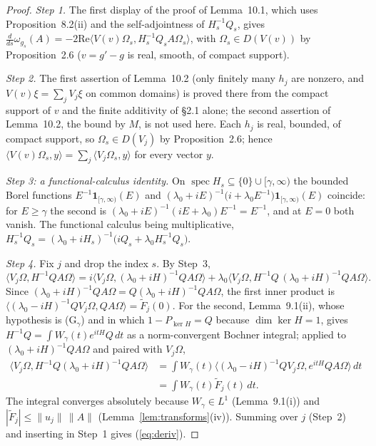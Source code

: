 \documentclass[11pt,a4paper]{article}
\newcommand{\Om}{\Omega}
\newcommand{\ip}[2]{\langle #1,#2\rangle}
\DeclareMathOperator{\spec}{spec}
\newcommand{\Ft}{\widetilde F}
\theoremstyle{plain}
\theoremstyle{definition}
\begin{document}
\begin{proof}
\emph{Step 1.}  The first display of the proof of Lemma~10.1, which uses Proposition~8.2(ii)
and the self-adjointness of $H_s^{-1}Q_s$, gives
$\frac d{ds}\omega_{g_s}(A)=-2\mathrm{Re}\ip{V(v)\Om_s}{H_s^{-1}Q_sA\Om_s}$, with
$\Om_s\in D(V(v))$ by Proposition~2.6 ($v=g'-g$ is real, smooth, of compact support).

\emph{Step 2.}  The first assertion of Lemma~10.2 (only finitely many $h_j$ are nonzero, and
$V(v)\xi=\sum_jV_j\xi$ on common domains) is proved there from the compact support of $v$ and
the finite additivity of \S2.1 alone; the second assertion of Lemma~10.2, the bound by $M$, is
not used here.  Each $h_j$ is real, bounded, of compact support, so $\Om_s\in D(V_j)$ by
Proposition~2.6; hence $\ip{V(v)\Om_s}{y}=\sum_j\ip{V_j\Om_s}{y}$ for every vector $y$.

\emph{Step 3: a functional-calculus identity.}  On $\spec H_s\subseteq\{0\}\cup[\gamma,\infty)$
the bounded Borel functions $E^{-1}\mathbf 1_{[\gamma,\infty)}(E)$ and
$(\lambda_0+iE)^{-1}\bigl(i+\lambda_0E^{-1}\bigr)\mathbf 1_{[\gamma,\infty)}(E)$ coincide: for
$E\ge\gamma$ the second is $(\lambda_0+iE)^{-1}(iE+\lambda_0)E^{-1}=E^{-1}$, and at $E=0$ both
vanish.  The functional calculus being multiplicative,
$H_s^{-1}Q_s=(\lambda_0+iH_s)^{-1}\bigl(iQ_s+\lambda_0H_s^{-1}Q_s\bigr)$.

\emph{Step 4.}  Fix $j$ and drop the index $s$.  By Step~3,
\[
 \ip{V_j\Om}{H^{-1}QA\Om}=i\ip{V_j\Om}{(\lambda_0+iH)^{-1}QA\Om}
 +\lambda_0\ip{V_j\Om}{H^{-1}Q\,(\lambda_0+iH)^{-1}QA\Om} .
\]
Since $(\lambda_0+iH)^{-1}QA\Om=Q(\lambda_0+iH)^{-1}QA\Om$, the first inner product is
$\ip{(\lambda_0-iH)^{-1}QV_j\Om}{QA\Om}=\Ft_j(0)$.  For the second, Lemma~9.1(ii), whose
hypothesis is (G$_\gamma$) and in which $1-P_{\ker H}=Q$ because $\dim\ker H=1$, gives
$H^{-1}Q=\int W_\gamma(t)e^{itH}Q\,dt$ as a norm-convergent Bochner integral; applied to
$(\lambda_0+iH)^{-1}QA\Om$ and paired with $V_j\Om$,
\begin{align*}
 \ip{V_j\Om}{H^{-1}Q(\lambda_0+iH)^{-1}QA\Om}
 &=\int W_\gamma(t)\ip{(\lambda_0-iH)^{-1}QV_j\Om}{e^{itH}QA\Om}\,dt\\
 &=\int W_\gamma(t)\Ft_j(t)\,dt .
\end{align*}
The integral converges absolutely because $W_\gamma\in L^1$ (Lemma~9.1(i)) and
$|\Ft_j|\le\|u_j\|\,\|A\|$ (Lemma~\ref{lem:transforms}(iv)).  Summing over $j$ (Step~2) and
inserting in Step~1 gives (\ref{eq:deriv}).
\end{proof}
\end{document}
